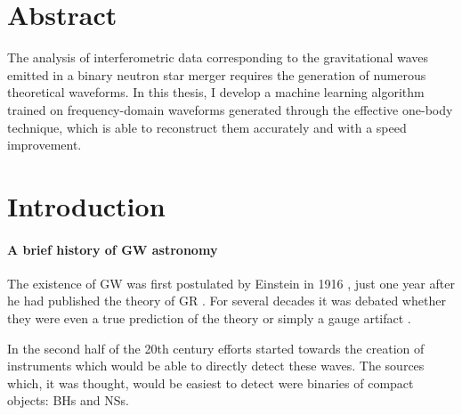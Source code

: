 \documentclass[main.tex]{subfiles}
\begin{document}
\vspace*{\fill}
\section*{Abstract}
The analysis of interferometric data corresponding to the gravitational waves emitted in a binary neutron star merger requires the generation of numerous theoretical waveforms.
In this thesis, I develop a machine learning algorithm trained on frequency-domain waveforms generated through the effective one-body technique, which is able to reconstruct them accurately and with a speed improvement.
\vspace*{\fill}


\newpage

\tableofcontents




\section*{Introduction}


\paragraph{A brief history of GW astronomy}

The existence of \acs{GW} was first postulated by Einstein in 1916 \cites{1916SPAW.......688E}{1918SPAW.......154E}, just one year after he had published the theory of \ac{GR} \cite[]{einsteinFeldgleichungenGravitation1915}. 
For several decades it was debated whether they were even a true prediction of the theory or simply a gauge artifact \cite{kennefickTravelingSpeedThought2007}. 

In the second half of the 20th century efforts started towards the creation of instruments which would be able to directly detect these waves. 
The sources which, it was thought, would be easiest to detect were binaries of compact objects: \acp{BH} and \acp{NS}.
\end{document}

